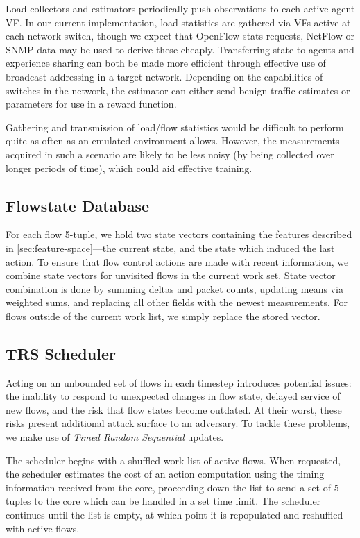 \documentclass[10pt, times, conference, letterpaper]{IEEEtran}
\begin{document}
Load collectors and estimators periodically push observations to each active agent VF.
In our current implementation, load statistics are gathered via VFs active at each network switch, though we expect that OpenFlow stats requests, NetFlow or SNMP data may be used to derive these cheaply.
Transferring state to agents and experience sharing can both be made more efficient through effective use of broadcast addressing in a target network.
Depending on the capabilities of switches in the network, the estimator can either send benign traffic estimates or parameters for use in a reward function.

Gathering and transmission of load/flow statistics would be difficult to perform quite as often as an emulated environment allows.
However, the measurements acquired in such a scenario are likely to be less noisy (by being collected over longer periods of time), which could aid effective training.

\subsection{Flowstate Database}
For each flow 5-tuple, we hold two state vectors containing the features described in \cref{sec:feature-space}---the current state, and the state which induced the last action.
To ensure that flow control actions are made with recent information, we combine state vectors for unvisited flows in the current work set.
State vector combination is done by summing deltas and packet counts, updating means via weighted sums, and replacing all other fields with the newest measurements.
For flows outside of the current work list, we simply replace the stored vector.

\subsection{TRS Scheduler}
Acting on an unbounded set of flows in each timestep introduces potential issues: the inability to respond to unexpected changes in flow state, delayed service of new flows, and the risk that flow states become outdated.
At their worst, these risks present additional attack surface to an adversary.
To tackle these problems, we make use of \emph{Timed Random Sequential} updates.

The scheduler begins with a shuffled work list of active flows.
When requested, the scheduler estimates the cost of an action computation using the timing information received from the core, proceeding down the list to send a set of 5-tuples to the core which can be handled in a set time limit.
The scheduler continues until the list is empty, at which point it is repopulated and reshuffled with active flows.
\end{document}
